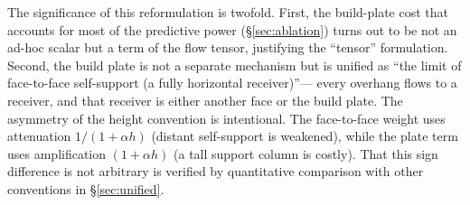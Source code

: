 \documentclass[11pt,a4paper]{article}
\begin{document}
The significance of this reformulation is twofold.
First, the build-plate cost that accounts for most of the predictive power (\S\ref{sec:ablation})
turns out to be not an ad-hoc scalar but a term of the flow tensor, justifying the ``tensor'' formulation.
Second, the build plate is not a separate mechanism but is unified as
``the limit of face-to-face self-support (a fully horizontal receiver)''---
every overhang flows to a receiver, and that receiver is either another face or the build plate.
The asymmetry of the height convention is intentional.
The face-to-face weight uses attenuation $1/(1+\alpha h)$ (distant self-support is weakened),
while the plate term uses amplification $(1+\alpha h)$ (a tall support column is costly).
That this sign difference is not arbitrary is verified by quantitative comparison with other conventions in \S\ref{sec:unified}.
\end{document}
